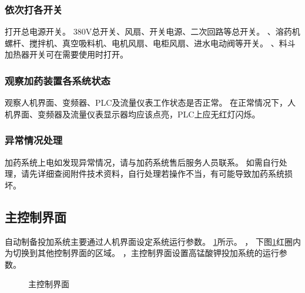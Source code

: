 \documentclass[UTF8,a4paper,12pt,titlepage]{ctexart}
\begin{document}
      \subsubsection{依次打各开关}
      打开总电源开关。
      380V总开关、风扇、开关电源、二次回路等总开关。
      、溶药机螺杆、搅拌机、真空吸料机、电机风扇、电柜风扇、进水电动阀等开关。
      、料斗加热器开关可在需要使用时打开。

      \subsubsection{观察加药装置各系统状态}
      观察人机界面、变频器、PLC及流量仪表工作状态是否正常。
      在正常情况下，人机界面、变频器及流量仪表显示器均应该点亮，PLC上应无红灯闪烁。

      \subsubsection{异常情况处理}
      加药系统上电如发现异常情况，请与加药系统售后服务人员联系。
      如需自行处理，请先详细查阅附件技术资料，自行处理若操作不当，有可能导致加药系统损坏。

   \subsection{主控制界面}\label{sec:s1}
      自动制备投加系统主要通过人机界面设定系统运行参数。
      \ref{fig:g7}所示。
      ，
      下图\ref{fig:g7}红圈内为切换到其他控制界面的区域。
      ，主控制界面设置高锰酸钾投加系统的运行参数。

      \begin{figure}[h]
         \centering
         \caption{主控制界面}\label{fig:g7}
      \end{figure}
\end{document}
